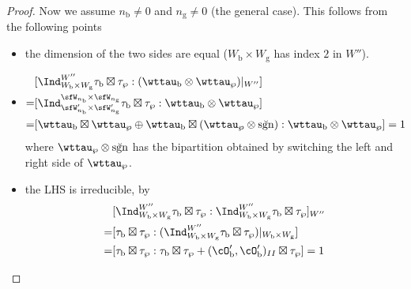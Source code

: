 \documentclass[12pt,a4paper]{amsart}
\newcommand{\sgn}{\operatorname{sgn}}
\numberwithin{equation}{section}
\theoremstyle{remark}
\def\brsgn{\breve{\sgn}}
\def\nbb{n_{\mathrm b}}
\def\ngg{n_{\mathrm g}}
\def\cOpb{\cO'_{\mathrm b}}
\begin{document}
\begin{proof}
{    Now we assume $\nbb\neq 0$ and $\ngg\neq 0$ (the general case). This
    follows from the following points
    \begin{itemize}
      \item the dimension of the two sides are equal ($W_{\mathrm b}\times W_{\mathrm g}$ has
            index $2$ in $W''$).
      \item
            \[
            \begin{split}
              &[\Ind_{W_{\mathrm b}\times W_{\mathrm g}}^{W''}\tau_{\mathrm b}\boxtimes \tau_{\wp}:(\wttau_{\mathrm b}\otimes \wttau_{\wp})|_{W''}] \\
              =& [\Ind_{\sfW'_{n_{\mathrm b}}\times \sfW'_{n_{\mathrm g}}}^{\sfW_{n_{\mathrm b}}\times \sfW_{n_{\mathrm g}}}\tau_{\mathrm b}\boxtimes \tau_{\wp}:\wttau_{\mathrm b}\otimes \wttau_{\wp}]\\
              =& [\wttau_{\mathrm b}\boxtimes \wttau_{\wp} \oplus \wttau_{\mathrm b}\boxtimes (\wttau_{\wp}\otimes \brsgn):\wttau_{\mathrm b}\otimes \wttau_{\wp}] =1\\
            \end{split}
            \]
            where $\wttau_{\wp}\otimes \brsgn$ has the bipartition obtained by
            switching the left and right side of $\wttau_{\wp}$.
      \item the LHS is irreducible, by
            \[
            \begin{split}
              & [\Ind_{W_{\mathrm b}\times W_{\mathrm g}}^{W''}\tau_{\mathrm b}\boxtimes \tau_{\wp}:
              \Ind_{W_{\mathrm b}\times W_{\mathrm g}}^{W''}\tau_{\mathrm b}\boxtimes \tau_{\wp}]_{W''}\\
              =&  [\tau_{\mathrm b}\boxtimes \tau_{\wp} : (\Ind_{W_{\mathrm b}\times W_{\mathrm g}}^{W''}\tau_{\mathrm b}\boxtimes \tau_{\wp})|_{W_{\mathrm b}\times W_{\mathrm g}}]\\
              =& [\tau_{\mathrm b}\boxtimes \tau_{\wp} : \tau_{\mathrm b}\boxtimes \tau_{\wp} + (\cOpb,\cOpb)_{II} \boxtimes \tau_{\wp} ] = 1
            \end{split}
            \]
    \end{itemize}
  }


\end{proof}
\end{document}

